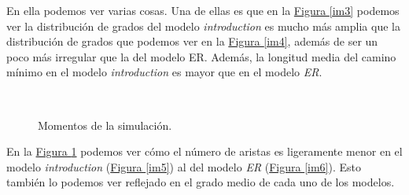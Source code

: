 \documentclass[paper=a4, fontsize=11pt]{article} %
\numberwithin{equation}{section} %
\numberwithin{figure}{section} %
\numberwithin{table}{section} %
\begin{document}
En ella podemos ver varias cosas. Una de ellas es que en la \hyperref[im3]{Figura \ref{im3}} podemos ver la distribución de grados del modelo \textit{introduction} es mucho más amplia que la distribución de grados que podemos ver en la \hyperref[im4]{Figura \ref{im4}}, además de ser un poco más irregular que la del modelo ER. Además, la longitud media del camino mínimo en el modelo \textit{introduction} es mayor que en el modelo \textit{ER}.

\begin{figure}[H]
    \centering
    \mbox{
        \qquad
    }
    \caption{Momentos de la simulación.}
    \label{imej3}
\end{figure}

En la \hyperref[imej3]{Figura \ref{imej3}} podemos ver cómo el número de aristas es ligeramente menor en el modelo \textit{introduction} (\hyperref[im5]{Figura \ref{im5}}) al del modelo \textit{ER} (\hyperref[im6]{Figura \ref{im6}}). Esto también lo podemos ver reflejado en el grado medio de cada uno de los modelos. 
\end{document}
